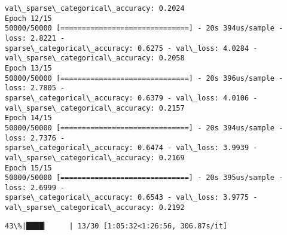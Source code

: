 \documentclass[11pt]{article}
\begin{document}
\begin{Verbatim}[commandchars=\\\{\}]
val\_sparse\_categorical\_accuracy: 0.2024
Epoch 12/15
50000/50000 [==============================] - 20s 394us/sample - loss: 2.8221 -
sparse\_categorical\_accuracy: 0.6275 - val\_loss: 4.0284 -
val\_sparse\_categorical\_accuracy: 0.2058
Epoch 13/15
50000/50000 [==============================] - 20s 396us/sample - loss: 2.7805 -
sparse\_categorical\_accuracy: 0.6379 - val\_loss: 4.0106 -
val\_sparse\_categorical\_accuracy: 0.2157
Epoch 14/15
50000/50000 [==============================] - 20s 394us/sample - loss: 2.7376 -
sparse\_categorical\_accuracy: 0.6474 - val\_loss: 3.9939 -
val\_sparse\_categorical\_accuracy: 0.2169
Epoch 15/15
50000/50000 [==============================] - 20s 395us/sample - loss: 2.6999 -
sparse\_categorical\_accuracy: 0.6543 - val\_loss: 3.9775 -
val\_sparse\_categorical\_accuracy: 0.2192
    \end{Verbatim}

    \begin{Verbatim}[commandchars=\\\{\}]
 43\%|████▎     | 13/30 [1:05:32<1:26:56, 306.87s/it]
    \end{Verbatim}
\end{document}
